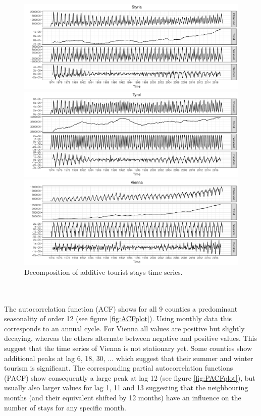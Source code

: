 \documentclass[a4paper,reqno,]{article}
\begin{document}
\begin{figure}[h!]
\centering
\begin{minipage}[t]{1\textwidth}
\centering
    \includegraphics[width=1\textwidth]{images/EA/ts_styria.pdf}
\end{minipage}
\begin{minipage}[t]{1\textwidth}
\centering
    \includegraphics[width=1\textwidth]{images/EA/ts_tyrol.pdf}
\end{minipage}
\begin{minipage}[t]{1\textwidth}
\centering
    \includegraphics[width=1\textwidth]{images/EA/ts_vienna.pdf}
\end{minipage}
\caption{Decomposition of additive tourist stays time series.}\label{fig:de}
\end{figure} 
\\\\The autocorrelation function (ACF) shows for all 9 counties a predominant seasonality of order 12 (see figure \ref{fig:ACFplot}). Using monthly data this corresponds to an annual cycle. For Vienna all values are positive but slightly decaying, whereas the others alternate between negative and positive values. This suggest that the time series of Vienna is not stationary yet. Some counties show additional peaks at lag 6, 18, 30, ... which suggest that their summer and winter tourism is significant. The corresponding partial autocorrelation functions (PACF)  show consequently a large peak at lag 12 (see figure \ref{fig:PACFplot}), but usually also larger values for lag 1, 11 and 13 suggesting that the neighbouring months (and their equivalent shifted by 12 months) have an influence on the number of stays for any specific month.
\end{document}
